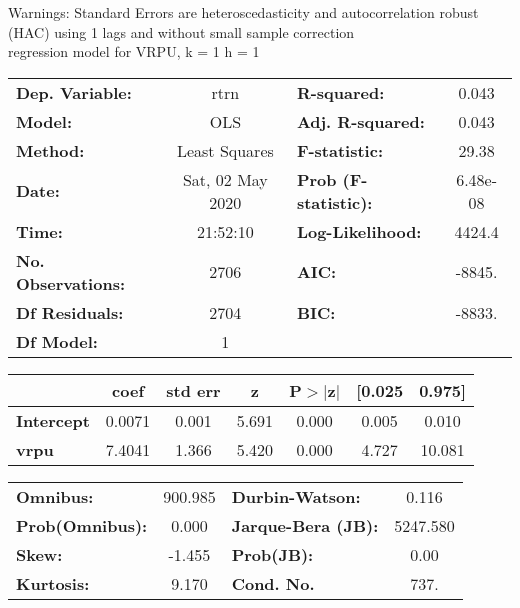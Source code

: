 Warnings: \newline
 [1] Standard Errors are heteroscedasticity and autocorrelation robust (HAC) using 1 lags and without small sample correction\\ 

regression model for VRPU, k = 1 h = 1\begin{center}
\begin{tabular}{lclc}
\toprule
\textbf{Dep. Variable:}    &       rtrn       & \textbf{  R-squared:         } &     0.043   \\
\textbf{Model:}            &       OLS        & \textbf{  Adj. R-squared:    } &     0.043   \\
\textbf{Method:}           &  Least Squares   & \textbf{  F-statistic:       } &     29.38   \\
\textbf{Date:}             & Sat, 02 May 2020 & \textbf{  Prob (F-statistic):} &  6.48e-08   \\
\textbf{Time:}             &     21:52:10     & \textbf{  Log-Likelihood:    } &    4424.4   \\
\textbf{No. Observations:} &        2706      & \textbf{  AIC:               } &    -8845.   \\
\textbf{Df Residuals:}     &        2704      & \textbf{  BIC:               } &    -8833.   \\
\textbf{Df Model:}         &           1      & \textbf{                     } &             \\
\bottomrule
\end{tabular}
\begin{tabular}{lcccccc}
                   & \textbf{coef} & \textbf{std err} & \textbf{z} & \textbf{P$> |$z$|$} & \textbf{[0.025} & \textbf{0.975]}  \\
\midrule
\textbf{Intercept} &       0.0071  &        0.001     &     5.691  &         0.000        &        0.005    &        0.010     \\
\textbf{vrpu}      &       7.4041  &        1.366     &     5.420  &         0.000        &        4.727    &       10.081     \\
\bottomrule
\end{tabular}
\begin{tabular}{lclc}
\textbf{Omnibus:}       & 900.985 & \textbf{  Durbin-Watson:     } &    0.116  \\
\textbf{Prob(Omnibus):} &   0.000 & \textbf{  Jarque-Bera (JB):  } & 5247.580  \\
\textbf{Skew:}          &  -1.455 & \textbf{  Prob(JB):          } &     0.00  \\
\textbf{Kurtosis:}      &   9.170 & \textbf{  Cond. No.          } &     737.  \\
\bottomrule
\end{tabular}
\end{center}

